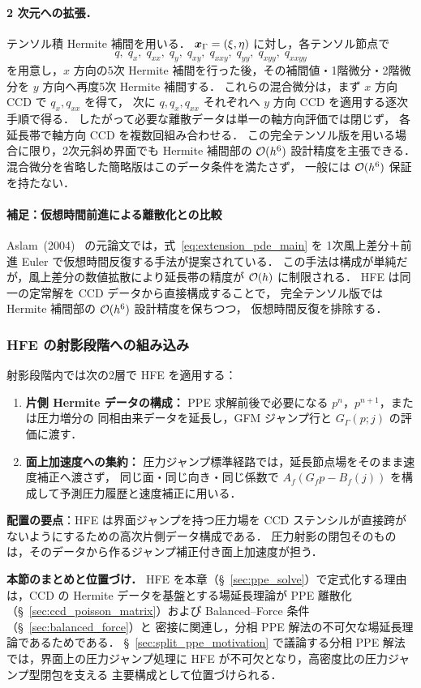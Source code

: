 \paragraph{2 次元への拡張．}
テンソル積 Hermite 補間を用いる．
$\bm{x}_\Gamma = (\xi,\eta)$ に対し，各テンソル節点で
\[
  q,\; q_x,\; q_{xx},\; q_y,\; q_{xy},\; q_{xxy},\;
  q_{yy},\; q_{xyy},\; q_{xxyy}
\]
を用意し，$x$ 方向の5次 Hermite 補間を行った後，その補間値・1階微分・2階微分を
$y$ 方向へ再度5次 Hermite 補間する．
これらの混合微分は，まず $x$ 方向 CCD で $q_x,q_{xx}$ を得て，
次に $q,q_x,q_{xx}$ それぞれへ $y$ 方向 CCD を適用する逐次手順で得る．
したがって必要な離散データは単一の軸方向評価では閉じず，
各延長帯で軸方向 CCD を複数回組み合わせる．
この完全テンソル版を用いる場合に限り，2次元斜め界面でも Hermite 補間部の
$\mathcal{O}(h^6)$ 設計精度を主張できる．混合微分を省略した簡略版はこのデータ条件を満たさず，
一般には $\mathcal{O}(h^6)$ 保証を持たない．

\paragraph{補足：仮想時間前進による離散化との比較}
Aslam~(2004)~\cite{Aslam2004} の元論文では，式~\eqref{eq:extension_pde_main} を
1次風上差分＋前進 Euler で仮想時間反復する手法が提案されている．
この手法は構成が単純だが，風上差分の数値拡散により延長帯の精度が $\mathcal{O}(h)$ に制限される．
HFE は同一の定常解を CCD データから直接構成することで，
完全テンソル版では Hermite 補間部の $\mathcal{O}(h^6)$ 設計精度を保ちつつ，
仮想時間反復を排除する．

\subsubsection{HFE の射影段階への組み込み}

射影段階内では次の2層で HFE を適用する：
\begin{enumerate}
  \item \textbf{片側 Hermite データの構成：}
        PPE 求解前後で必要になる $p^n$，$p^{n+1}$，または圧力増分の
        同相由来データを延長し，GFM ジャンプ行と $G_\Gamma(p;j)$ の評価に渡す．
  \item \textbf{面上加速度への集約：}
        圧力ジャンプ標準経路では，延長節点場をそのまま速度補正へ渡さず，
        同じ面・同じ向き・同じ係数で
        $A_f(G_fp-B_f(j))$ を構成して予測圧力履歴と速度補正に用いる．
\end{enumerate}
\textbf{配置の要点}：HFE は界面ジャンプを持つ圧力場を
CCD ステンシルが直接跨がないようにするための高次片側データ構成である．
圧力射影の閉包そのものは，そのデータから作るジャンプ補正付き面上加速度が担う．

\medskip
\noindent\textbf{本節のまとめと位置づけ．}
HFE を本章（§~\ref{sec:ppe_solve}）で定式化する理由は，CCD の Hermite データを基盤とする場延長理論が
PPE 離散化（§~\ref{sec:ccd_poisson_matrix}）および Balanced--Force 条件（§~\ref{sec:balanced_force}）と
密接に関連し，分相 PPE 解法の不可欠な場延長理論であるためである．
§~\ref{sec:split_ppe_motivation} で議論する分相 PPE 解法では，界面上の圧力ジャンプ処理に
HFE が不可欠となり，高密度比の圧力ジャンプ型閉包を支える
主要構成として位置づけられる．

